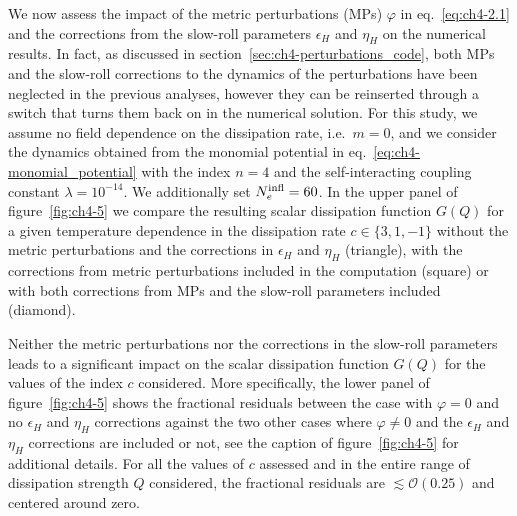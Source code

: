 We now assess the impact of the metric perturbations (MPs) $\varphi$ in eq.~\eqref{eq:ch4-2.1} and the corrections from the slow-roll parameters $\epsilon_H$ and $\eta_H$ on the numerical results. In fact, as discussed in section~\ref{sec:ch4-perturbations_code}, both MPs and the slow-roll corrections to the dynamics of the perturbations have been neglected in the previous analyses, however they can be reinserted through a switch that turns them back on in the numerical solution.
For this study, we assume no field dependence on the dissipation rate, i.e.\ $m=0$, and we consider the dynamics obtained from the monomial potential in eq.~\eqref{eq:ch4-monomial_potential} with the index $n=4$ and the self-interacting coupling constant $\lambda=10^{-14}$. We additionally set $N_e^{\rm infl}=60$. In the upper panel of figure~\ref{fig:ch4-5} we compare the resulting scalar dissipation function $G(Q)$ for a given temperature dependence in the dissipation rate $c\in\{3,1,-1\}$ without the metric perturbations and the corrections in $\epsilon_H$ and $\eta_H$ (triangle), with the corrections from metric perturbations included in the computation (square) or with both corrections from MPs and the slow-roll parameters included (diamond).

Neither the metric perturbations nor the corrections in the slow-roll parameters leads to a significant impact on the scalar dissipation function $G(Q)$ for the values of the index $c$ considered. More specifically, the lower panel of figure~\ref{fig:ch4-5} shows the fractional residuals between the case with $\varphi=0$ and no $\epsilon_H$ and $\eta_H$ corrections against the two other cases where $\varphi\neq 0$ and the $\epsilon_H$ and $\eta_H$ corrections are included or not, see the caption of figure~\ref{fig:ch4-5} for additional details. For all the values of $c$ assessed and in the entire range of dissipation strength $Q$ considered, the fractional residuals are $\lesssim\mathcal{O}(0.25)$ and centered around zero.


